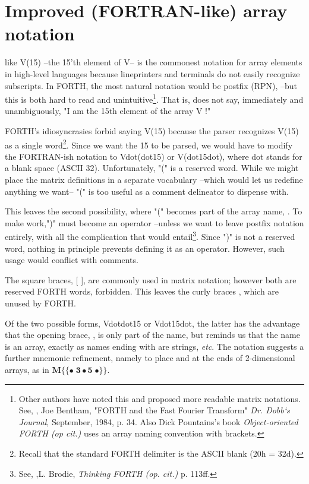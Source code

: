 \section{Improved (FORTRAN-like) array notation}
 like V(15) --the 15'th element of V-- is the commonest notation for array elements in high-level languages because lineprinters and terminals do not easily recognize subscripts. In FORTH, the most natural notation would be postfix (RPN),  --but this is both hard to read and unintuitive\footnote{Other authors have noted this and proposed more readable matrix notations. See, \eg, Joe Bentham, "FORTH and the Fast Fourier Transform" \textit{Dr. Dobb‘s Journal}, September, 1984, p. 34. Also Dick Pountains's book \textit{Object-oriented FORTH (op cit.)} uses an array naming convention with brackets.}. That is,  does not say, immediately and unambiguously, "I am the 15th element of the array V !"

FORTH's idiosyncrasies forbid saying V(15) because the parser recognizes V(15) as a single word\footnote{Recall that the standard FORTH delimiter is the ASCII blank (20h = 32d).}. Since we want the 15 to be parsed, we would have to modify the FORTRAN-ish notation to Vdot(dot15) or V(dot15dot), where dot stands for a blank space (ASCII 32). Unfortunately, "(" is a reserved word. While we might place the matrix definitions in a separate vocabulary --which would let us redefine anything we want-- "(" is too useful as a comment delineator to dispense with.

This leaves the second possibility, where "(" becomes part of the array name, . To make  work,")" must become an operator --unless we want to leave postfix notation entirely, with all the complication that would entail\footnote{See, \eg,L. Brodie, \textit{Thinking FORTH (op. cit.)} p. 113ff.}. Since ")" is not a reserved word, nothing in principle prevents defining it as an operator. However, such usage would conflict with comments.

The square braces, [ ], are commonly used in matrix notation; however both are reserved FORTH words, \ie forbidden. This leaves the curly braces { }, which are unused by FORTH.

Of the two possible forms, Vdot{dot15} or V{dot15dot}, the latter has the
advantage that the opening brace, \regc{\{}, is only part of the name, but
reminds us that the name  is an array, exactly as names ending with
\bc{\$} are strings, \textit{etc}. The notation suggests a further mnemonic
refinement, namely to place \bc{\{\{} and \bc{\}\}} at the ends of
2-dimensional arrays, as in $\mathbf{M\{\{\bullet \;3 \bullet 5 \;\bullet \}\}}$.

